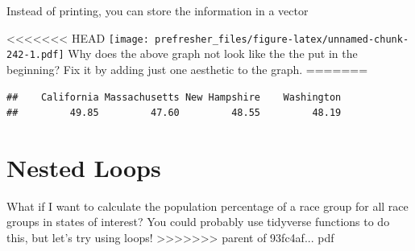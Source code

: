 \documentclass[]{book}
\newenvironment{Shaded}{\begin{snugshade}}{\end{snugshade}}
\newcommand{\ControlFlowTok}[1]{\textcolor[rgb]{0.13,0.29,0.53}{\textbf{#1}}}
\newcommand{\DataTypeTok}[1]{\textcolor[rgb]{0.13,0.29,0.53}{#1}}
\newcommand{\DecValTok}[1]{\textcolor[rgb]{0.00,0.00,0.81}{#1}}
\newcommand{\KeywordTok}[1]{\textcolor[rgb]{0.13,0.29,0.53}{\textbf{#1}}}
\newcommand{\NormalTok}[1]{#1}
\newcommand{\OperatorTok}[1]{\textcolor[rgb]{0.81,0.36,0.00}{\textbf{#1}}}
\newcommand{\StringTok}[1]{\textcolor[rgb]{0.31,0.60,0.02}{#1}}
\theoremstyle{definition}
\theoremstyle{definition}
\theoremstyle{definition}
\theoremstyle{remark}
\begin{document}
\begin{Shaded}
\begin{Highlighting}[]
\begin{Shaded}
\begin{Highlighting}[]
\begin{Shaded}
\begin{Highlighting}[]
Instead of printing, you can store the information in a vector

\begin{Shaded}
\end{Shaded}

<<<<<<< HEAD
\texttt{[image: prefresher\_files/figure-latex/unnamed-chunk-242-1.pdf]}
Why does the above graph not look like the the put in the beginning? Fix it by adding just one aesthetic to the graph.
=======
\begin{verbatim}
##    California Massachusetts New Hampshire    Washington 
##         49.85         47.60         48.55         48.19
\end{verbatim}

\hypertarget{nested-loops}{%
\section{Nested Loops}\label{nested-loops}}

What if I want to calculate the population percentage of a race group for all race groups in states of interest?
You could probably use tidyverse functions to do this, but let's try using loops!
>>>>>>> parent of 93fc4af... pdf


\end{Highlighting}
\end{Shaded}
\end{Highlighting}
\end{Shaded}
\end{Highlighting}
\end{Shaded}
\end{document}
